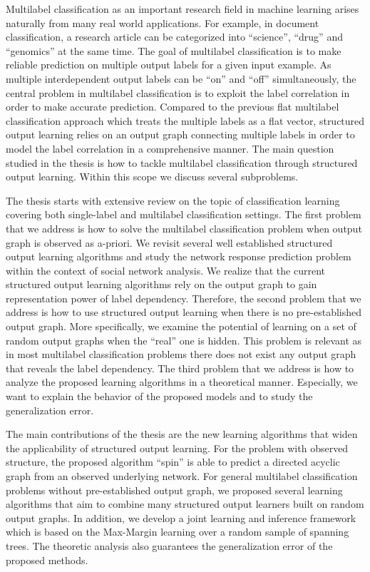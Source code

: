 \documentclass[10pt]{article}
\begin{document}
\setlength{\parindent}{3mm}
\small

\noindent Multilabel classification as an important research field in machine learning arises naturally from many real world applications. For example, in document classification, a research article can be categorized into ``science'', ``drug'' and ``genomics'' at the same time. The goal of multilabel classification is to make reliable prediction on multiple output labels for a given input example. As multiple interdependent output labels can be ``on'' and ``off'' simultaneously, the central problem in multilabel classification is to exploit the label correlation in order to make accurate prediction. Compared to the previous flat multilabel classification approach which treats the multiple labels as a flat vector, structured output learning relies on an output graph connecting multiple labels in order to model the label correlation in a comprehensive manner. The main question studied in the thesis is how to tackle multilabel classification through structured output learning. Within this scope we discuss several subproblems.

The thesis starts with extensive review on the topic of classification learning covering both single-label and multilabel classification settings. The first problem that we address is how to solve the multilabel classification problem when output graph is observed as a-priori. We revisit several well established structured output learning algorithms and study the network response prediction problem within the context of social network analysis. We realize that the current structured output learning algorithms rely on the output graph to gain representation power of label dependency. Therefore, the second problem that we address is how to use structured output learning when there is no pre-established output graph. More specifically, we examine the potential of learning on a set of random output graphs when the ``real'' one is hidden. This problem is relevant as in most multilabel classification problems there does not exist any output graph that reveals the label dependency. The third problem that we address is how to analyze the proposed learning algorithms in a theoretical manner. Especially, we want to explain the behavior of the proposed models and to study the generalization error.

The main contributions of the thesis are the new learning algorithms that widen the applicability of structured output learning. For the problem with observed structure, the proposed algorithm ``{\sc spin}'' is able to predict a directed acyclic graph from an observed underlying network. For general multilabel classification problems without pre-established output graph, we proposed several learning algorithms that aim to combine many structured output learners built on random output graphs. In addition, we develop a joint learning and inference framework which is based on the Max-Margin learning over a random sample of spanning trees. The theoretic analysis also guarantees the generalization error of the proposed methods.
\end{document}
